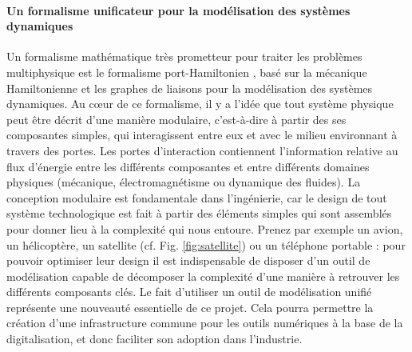 \documentclass[12pt, french]{article}
\begin{document}
	\paragraph{\large Un formalisme unificateur pour la modélisation des systèmes dynamiques\\}
	Un formalisme mathématique très prometteur pour traiter les problèmes multiphysique est le formalisme port-Hamiltonien \cite{vanderSchaft2002}, basé sur la mécanique Hamiltonienne et les graphes de liaisons pour la modélisation des systèmes dynamiques. Au c\oe{}ur de ce formalisme, il y a l'idée que tout système physique peut être décrit d'une manière modulaire, c'est-à-dire à partir des ses composantes simples, qui interagissent entre eux et avec le milieu environnant à travers des portes. Les portes d'interaction contiennent l'information relative au flux d'énergie entre les différents composantes et entre différents domaines physiques (mécanique, électromagnétisme ou dynamique des fluides). La conception modulaire est fondamentale dans l'ingénierie, car le design de tout système technologique est fait à partir des éléments simples qui sont assemblés pour donner lieu à la complexité qui nous entoure. Prenez par exemple un avion, un hélicoptère, un satellite (cf. Fig. \ref{fig:satellite}) ou un téléphone portable : pour pouvoir optimiser leur design il est indispensable de disposer d'un outil de modélisation capable de décomposer la complexité d'une manière à retrouver les différents composants clés. Le fait d'utiliser un outil de modélisation unifié représente une nouveauté essentielle de ce projet. Cela pourra permettre la création d'une infrastructure commune pour les outils numériques à la base de la digitalisation, et donc faciliter son adoption dans l'industrie.
	
\end{document}
